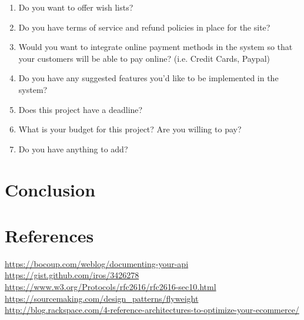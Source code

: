 \documentclass{report}
\begin{document}
\begin{enumerate}
\item Do you want to offer wish lists?
\item Do you have terms of service and refund policies in place for the site?
\item Would you want to integrate online payment methods in the system so that your
customers will be able to pay online? (i.e. Credit Cards, Paypal)
\item Do you have any suggested features you’d like to be implemented in the system?
\item Does this project have a deadline?
\item What is your budget for this project? Are you willing to pay?
\item Do you have anything to add?
\end{enumerate}

\chapter{Conclusion}

\chapter{References}
\url {https://bocoup.com/weblog/documenting-your-api}\\ 
\url {https://gist.github.com/iros/3426278}\\
\url {https://www.w3.org/Protocols/rfc2616/rfc2616-sec10.html} \\
\url {https://sourcemaking.com/design_patterns/flyweight} \\
\url {http://blog.rackspace.com/4-reference-architectures-to-optimize-your-ecommerce/} \\
\end{document}
